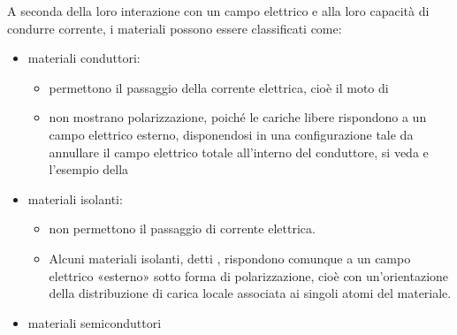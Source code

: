 \documentclass[letterpaper,10pt,italian]{jupyterBook}
\begin{document}
\sphinxAtStartPar
A seconda della loro interazione con un campo elettrico e alla loro capacità di condurre corrente, i materiali possono essere classificati come:
\begin{itemize}
\item {} 
\sphinxAtStartPar
materiali conduttori:
\begin{itemize}
\item {} 
\sphinxAtStartPar
permettono il passaggio della corrente elettrica, cioè il moto di 

\item {} 
\sphinxAtStartPar
non mostrano polarizzazione, poiché le cariche libere rispondono a un campo elettrico esterno, disponendosi in una configurazione tale da annullare il campo elettrico totale all’interno del conduttore, si veda  e l’esempio della 

\end{itemize}

\item {} 
\sphinxAtStartPar
materiali isolanti:
\begin{itemize}
\item {} 
\sphinxAtStartPar
non permettono il passaggio di corrente elettrica.

\item {} 
\sphinxAtStartPar
Alcuni materiali isolanti, detti , rispondono comunque a un campo elettrico «esterno» sotto forma di polarizzazione, cioè con un’orientazione della distribuzione di carica locale associata ai singoli atomi del materiale.

\end{itemize}

\item {} 
\sphinxAtStartPar
materiali semi\sphinxhyphen{}conduttori

\end{itemize}
\end{document}
